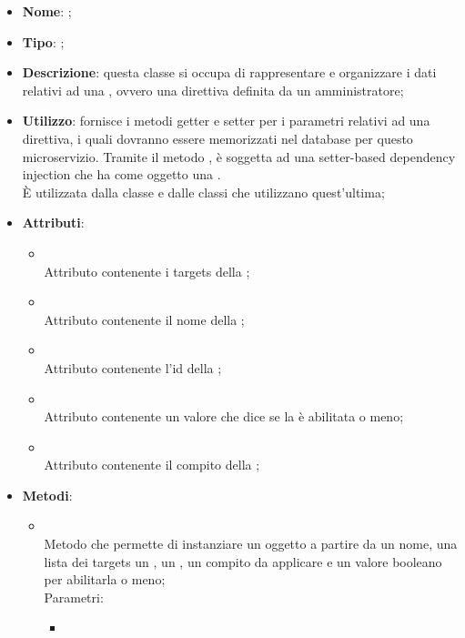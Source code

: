 \begin{itemize}
	\item \textbf{Nome}: ;
	\item \textbf{Tipo}: ;
	\item \textbf{Descrizione}: questa classe si occupa di rappresentare e organizzare i dati relativi ad una , ovvero una direttiva definita da un amministratore;
	\item \textbf{Utilizzo}: fornisce i metodi getter e setter per i parametri relativi ad una direttiva, i quali dovranno essere memorizzati nel database per questo microservizio. Tramite il metodo , è soggetta ad una setter-based dependency injection che ha come oggetto una . \\
	È utilizzata dalla classe  e dalle classi che utilizzano quest'ultima;
	\item \textbf{Attributi}:
	\begin{itemize}
		\item[]  \\
		Attributo contenente i targets della ;
		\item[]  \\
		Attributo contenente il nome della ;
		\item[]  \\
		Attributo contenente l'id della ;
		\item[]  \\
		Attributo contenente un valore che dice se la  è abilitata o meno;
		\item[]  \\
		Attributo contenente il compito della ;
	\end{itemize}
	\item \textbf{Metodi}:
	\begin{itemize}
		\item[]  \\		Metodo che permette di instanziare un oggetto  a partire da un nome, una lista dei targets un , un , un compito da applicare e un valore booleano per abilitarla o meno;\\
		Parametri:
		\begin{itemize}
			\item {} \\

\end{itemize}
\end{itemize}
\end{itemize}
